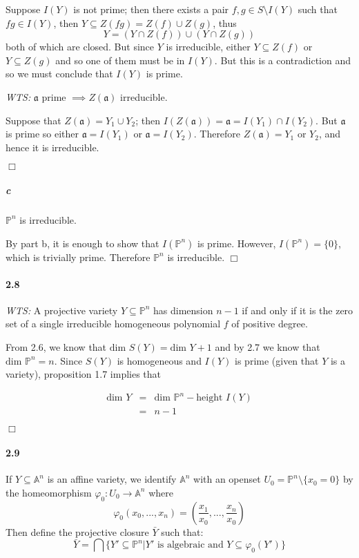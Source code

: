 \documentclass{article}
\begin{document}
Suppose $I(Y)$ is not prime; then there exists a pair $f,g \in S \setminus I(Y)$ such that $fg \in I(Y)$, then $Y \subseteq Z(fg) = Z(f) \cup Z(g)$, thus
\[ Y = (Y \cap Z(f)) \cup (Y \cap Z(g)) \]
both of which are closed.  But since $Y$ is irreducible, either $Y \subseteq Z(f)$ or $Y \subseteq Z(g)$ and so one of them must be in $I(Y)$.  But this is a contradiction and so we must conclude that $I(Y)$ is prime.

\emph{WTS:} $\mathfrak{a}$ prime $\implies Z(\mathfrak{a})$ irreducible.

Suppose that $Z(\mathfrak{a}) = Y_1 \cup Y_2$; then $I(Z(\mathfrak{a})) = \mathfrak{a} = I(Y_1) \cap I(Y_2)$.  But $\mathfrak{a}$ is prime so either $\mathfrak{a} = I(Y_1)$ or $\mathfrak{a} = I(Y_2)$.  Therefore $Z(\mathfrak{a}) = Y_1$ or $Y_2$, and hence it is irreducible.

$\Box$

\subparagraph{c}
$\mathbb{P}^n$ is irreducible.

By part b, it is enough to show that $I(\mathbb{P}^n)$ is prime.  However, $I(\mathbb{P}^n) = \{ 0 \}$, which is trivially prime.  Therefore $\mathbb{P}^n$ is irreducible. $\Box$

\paragraph{2.8}
\emph{WTS:} A projective variety $Y \subseteq \mathbb{P}^n$ has dimension $n - 1$ if and only if it is the zero set of a single irreducible homogeneous polynomial $f$ of positive degree.

From 2.6, we know that $\textrm{dim } S(Y) = \textrm{dim } Y + 1$ and by 2.7 we know that $\textrm{dim } \mathbb{P}^n = n$.  Since $S(Y)$ is homogeneous and $I(Y)$ is prime (given that $Y$ is a variety), proposition 1.7 implies that

\begin{eqnarray*}
\textrm{dim } Y & = & \textrm{dim } \mathbb{P}^n - \textrm{height } I(Y) \\
 & = & n - 1
\end{eqnarray*}

$\Box$
\paragraph{2.9}
If $Y \subseteq \mathbb{A}^n$ is an affine variety, we identify $\mathbb{A}^n$ with an openset $U_0 = \mathbb{P}^n \setminus \{ x_0 = 0 \}$ by the homeomorphism $\varphi_0 : U_0 \to \mathbb{A}^n$ where 
\[ \varphi_0(x_0, ..., x_n) = \left ( \frac{x_1}{x_0}, ..., \frac{x_n}{x_0} \right ) \]
Then define the projective closure $\bar{Y}$ such that:
\[ \bar{Y} = \bigcap \{ Y' \subseteq \mathbb{P}^n | Y' \textrm{ is algebraic and } Y \subseteq \varphi_0(Y') \} \]
\end{document}
